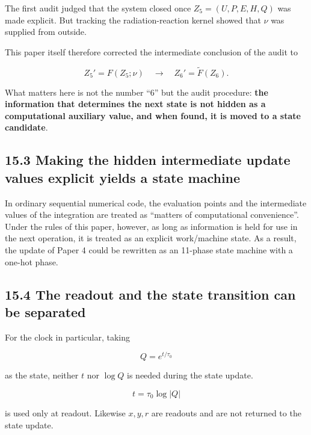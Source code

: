 \documentclass[
  a4paper,
]{article}
\begin{document}
The first audit judged that the system closed once \(Z_5=(U,P,E,H,Q)\)
was made explicit. But tracking the radiation-reaction kernel showed
that \(\nu\) was supplied from outside.

This paper itself therefore corrected the intermediate conclusion of the
audit to

\[
\boxed{
Z_5'=F(Z_5;\nu)
\quad\longrightarrow\quad
Z_6'=\widetilde F(Z_6).
}
\]

What matters here is not the number ``6'' but the audit procedure:
\textbf{the information that determines the next state is not hidden as
a computational auxiliary value, and when found, it is moved to a state
candidate}.

\subsection{15.3 Making the hidden intermediate update values explicit
yields a state
machine}\label{making-the-hidden-intermediate-update-values-explicit-yields-a-state-machine}

In ordinary sequential numerical code, the evaluation points and the
intermediate values of the integration are treated as ``matters of
computational convenience''. Under the rules of this paper, however, as
long as information is held for use in the next operation, it is treated
as an explicit work/machine state. As a result, the update of Paper 4
could be rewritten as an 11-phase state machine with a one-hot phase.

\subsection{15.4 The readout and the state transition can be
separated}\label{the-readout-and-the-state-transition-can-be-separated}

For the clock in particular, taking

\[
Q=e^{t/\tau_0}
\]

as the state, neither \(t\) nor \(\log Q\) is needed during the state
update.

\[
t=\tau_0\log|Q|
\]

is used only at readout. Likewise \(x,y,r\) are readouts and are not
returned to the state update.

\begin{center}
\end{center}
\end{document}

